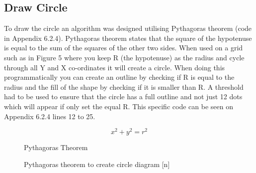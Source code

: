 \documentclass[a4paper,12pt]{article}
\begin{document}
\subsection{Draw Circle}
\begin{flushleft}
To draw the circle an algorithm was designed utilising Pythagoras theorem (code in Appendix 6.2.4). Pythagoras theorem states that the square of the hypotenuse is equal to the sum of the squares of the other two sides. \newline \newline When used on a grid such as in Figure 5 where you keep R (the hypotenuse) as the radius and cycle through all Y and X co-ordinates it will create a circle. When doing this programmatically you can create an outline by checking if R is equal to the radius and the fill of the shape by checking if it is smaller than R. A threshold had to be used to ensure that the circle has a full outline and not just 12 dots which will appear if only set the equal R. This specific code can be seen on Appendix 6.2.4 lines 12 to 25. 
\newline
\newline
\end{flushleft}
\begin{figure}[h]
	\centering
	\[ x^2 + y^2 = r^2 \]
	\caption{Pythagoras Theorem}
\end{figure}
\begin{figure}[h]
	\centering
	\setlength{\belowcaptionskip}{-15pt}
	\caption{Pythagoras theorem to create circle diagram [n]}
\end{figure}
\end{document}
